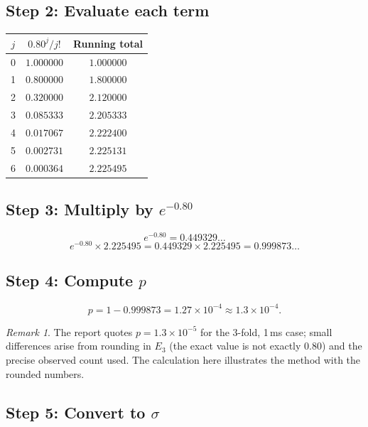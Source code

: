 \documentclass[12pt]{article}
\theoremstyle{definition}
\theoremstyle{remark}
\newtheorem{remark}{Remark}
\newcommand{\Eacc}{E}
\begin{document}
\subsection{Step 2: Evaluate each term}

\begin{center}
\renewcommand{\arraystretch}{1.3}
\begin{tabular}{ccc}
\toprule
$j$ & $0.80^j / j!$ & Running total \\
\midrule
0 & $1.000000$ & $1.000000$ \\
1 & $0.800000$ & $1.800000$ \\
2 & $0.320000$ & $2.120000$ \\
3 & $0.085333$ & $2.205333$ \\
4 & $0.017067$ & $2.222400$ \\
5 & $0.002731$ & $2.225131$ \\
6 & $0.000364$ & $2.225495$ \\
\bottomrule
\end{tabular}
\end{center}

\subsection{Step 3: Multiply by $e^{-0.80}$}

\[
  e^{-0.80} = 0.449329\ldots
\]
\[
  e^{-0.80} \times 2.225495 = 0.449329 \times 2.225495 = 0.999873\ldots
\]

\subsection{Step 4: Compute $p$}

\begin{equation}
  p = 1 - 0.999873 = 1.27 \times 10^{-4}
  \approx 1.3 \times 10^{-4}.
  \label{eq:ex-p}
\end{equation}

\begin{remark}
  The report quotes $p = 1.3 \times 10^{-5}$ for the 3-fold, 1\,ms
  case; small differences arise from rounding in $\Eacc_3$ (the exact
  value is not exactly 0.80) and the precise observed count used.  The
  calculation here illustrates the method with the rounded numbers.
\end{remark}

\subsection{Step 5: Convert to $\sigma$}
\end{document}
